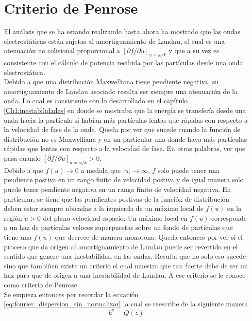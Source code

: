 \documentclass[../tesis_main_file.tex]{subfiles}
\begin{document}
\section{Criterio de Penrose}
El análisis que se ha estando realizando hasta ahora ha mostrado que las ondas electrostáticas están sujetas al amortiguamiento de Landau,
el cual es una atenuación no colisional proporcional a $[\partial f / \partial u]_{u=\omega / k}$ y que a su vez es consistente con el cálculo de potencia recibida por las partículas desde una onda electrostática.\\
Debido a que una distribución Maxwelliana tiene pendiente negativa, su amortiguamiento de Landau asociado resulta ser siempre una atenuación de la onda.
Lo cual es consistente con lo desarrollado en el capítulo \ref{Ch1:inestabilidades} en donde se mostraba que la energía se transfería desde una onda hacia la partícula si habían más partículas lentas que rápidas con respecto a la velocidad de fase de la onda.
Queda por ver que sucede cuando la función de distribución no es Maxwelliana y en un particular una donde haya más partículas rápidas que lentas con respecto a la velocidad de fase.
En otras palabras, ver que pasa cuando $[\partial f / \partial u]_{u=\omega / k} > 0$.\\
Debido a que $f(u) \to 0$ a medida que $|u| \to \infty $, $f$ solo puede tener una pendiente postiva en un rango finito de velocidad postiva y de igual manera solo puede tener pendiente negativa en un rango finito de velocidad negativa.
En particular, se tiene que las pendientes postivas de la función de distribución deben estar siempre ubicadas a la izquierda de un máximo local de $f(u)$ en la región $u>0$ del plano velocidad-espacio.
Un máximo local en $f(u)$ corresponde a un haz de partículas veloces superpuestas sobre un fondo de partículas que tiene una $f(u)$ que decrece de manera monotona.
Queda entonces por ver si el proceso que da origen al amortiguamiento de Landau puede ser revertido en el sentido que genere una inestabilidad en las ondas.
Resulta que no solo eso sucede sino que tambiñen existe un criterio el cual muestra que tan fuerte debe de ser un haz para que de origen a una inestabilidad de Landau. A ese criterio se le conoce como criterio de Penrose. \cite{bellan2008fundamentals}\\
Se empieza entonces por recordar la ecuación \ref{eq:fourier_dispersion_sin_normalizar} la cual se reescribe de la siguiente manera
\begin{equation}
\label{eq:k2=Q}
k^2 =Q(z)
\end{equation}
\end{document}
